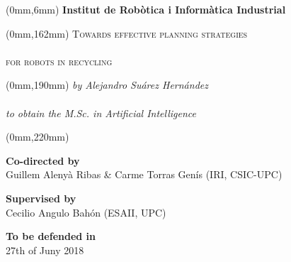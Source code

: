 \begin{titlingpage}
	\AddToShipoutPicture*{\BackgroundPic}
	
	\begin{textblock*}{205mm}(0mm,6mm)
		{\bfseries\sffamily\color{white}\LARGE\null\hfill Institut de Rob\`otica i Inform\`atica Industrial}
	\end{textblock*}
	
	\begin{textblock*}{205mm}(0mm,162mm)
		{\scshape\sffamily\color{white}\Huge\noindent\null\hfill Towards effective planning strategies\\\\%
		\null\hfill for robots in recycling}
	\end{textblock*}
	
	\begin{textblock*}{205mm}(0mm,190mm)
		{\itshape\sffamily\color{white}\LARGE\noindent\null\hfill by Alejandro Su\'arez Hern\'andez \\\\%
		\null\hfill to obtain the M.Sc. in Artificial Intelligence}
	\end{textblock*}
	
	\begin{textblock*}{210mm}(0mm,220mm)
		\begin{center}
		\textbf{Co-directed by}\\
		Guillem Aleny\`a Ribas \& Carme Torras Gen\'is  (IRI, CSIC-UPC)
		
		\vspace{0.5cm}
		
		\textbf{Supervised by}\\
		Cecilio Angulo Bah\'on (ESAII, UPC)
		
		\vspace{0.5cm}
		
		\textbf{To be defended in}\\
		27th of Juny 2018
		
		\end{center}
	\end{textblock*}
	
	\mbox{} %

\end{titlingpage}